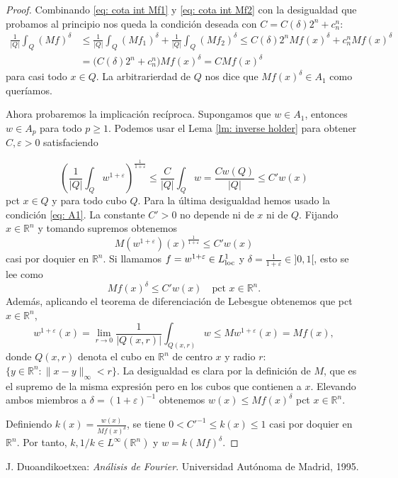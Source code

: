 \documentclass[12pt,english]{article}
\theoremstyle{definition}
\theoremstyle{remark}
\begin{document}
\begin{proof}
Combinando \eqref{eq: cota int Mf1} y \eqref{eq: cota int Mf2} con la desigualdad que probamos al principio nos queda la condición deseada con $C=C(\delta)2^{n}+c_n^n$:
\begin{align*}
\frac{1}{|Q|}\int_Q (Mf)^\delta& \leq \frac{1}{|Q|}\int_Q (Mf_1)^\delta + \frac{1}{|Q|}\int_Q (Mf_2)^\delta\leq C(\delta)2^{n} Mf(x)^\delta+c_n^n Mf(x)^\delta \\
&=\big(C(\delta)2^{n}+c_n^n\big) Mf(x)^\delta =C Mf(x)^\delta
\end{align*}
para casi todo $x\in Q$. La arbitrarierdad de $Q$ nos dice que $Mf(x)^\delta\in A_1$ como queríamos.

Ahora probaremos la implicación recíproca. Supongamos que $w\in A_1$, entonces $w\in A_p$ para todo $p\geq 1$. Podemos usar el Lema \ref{lm: inverse holder} para obtener $C,\varepsilon>0$ satisfaciendo

\[\left(\frac{1}{|Q|}\int_Q w^{1+\varepsilon}\right)^{\frac{1}{1+\varepsilon}}\leq \frac{C}{|Q|}\int_Q w=\frac{C w(Q)}{|Q|}\leq C' w(x)\]
pct $x\in Q$ y para todo cubo $Q$. Para la última desigualdad hemos usado la condición \eqref{eq: A1}. La constante $C'>0$ no depende ni de $x$ ni de $Q$. Fijando $x\in\mathbb{R}^n$ y tomando supremos obtenemos
\[M(w^{1+\varepsilon})(x)^\frac{1}{1+\varepsilon}\leq C' w(x)\]
casi por doquier en $\mathbb{R}^n$. Si llamamos $f=w^{1+\varepsilon}\in L^1_{\rm loc}$ y $\delta=\frac{1}{1+\varepsilon}\in ]0,1[$, esto se lee como
\[Mf(x)^\delta\leq C' w(x)\quad\text{pct $x\in\mathbb{R}^n$}.\]
Además, aplicando el teorema de diferenciación de Lebesgue obtenemos que pct $x\in\mathbb{R}^n$,
\[w^{1+\varepsilon}(x)=\lim_{r\to 0}\frac{1}{|Q(x,r)|}\int_{Q(x,r)}w\leq Mw^{1+\varepsilon}(x)=Mf(x),\]
donde $Q(x,r)$ denota el cubo en $\mathbb{R}^n$ de centro $x$ y radio $r$: $\{y\in\mathbb{R}^n: \|x-y\|_\infty < r\}$. La desigualdad es clara por la definición de $M$, que es el supremo de la misma expresión pero en los cubos que contienen a $x$. Elevando ambos miembros a $\delta=(1+\varepsilon)^{-1}$ obtenemos $w(x)\leq Mf(x)^\delta$ pct $x\in\mathbb{R}^n$.

Definiendo $k(x)=\frac{w(x)}{Mf(x)^\delta}$, se tiene $0<C'^{-1}\leq k(x)\leq 1$ casi por doquier en $\mathbb{R}^n$. Por tanto, $k,1/k\in L^\infty(\mathbb{R}^n)$ y $w=k (Mf)^\delta$.
\end{proof}

\begin{thebibliography}{99}
 J. Duoandikoetxea: \emph{Análisis de Fourier}. Universidad Autónoma de Madrid, 1995.
\end{thebibliography}
\end{document}
